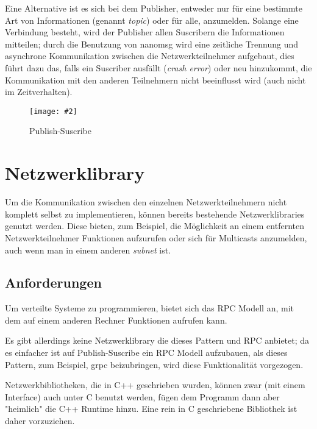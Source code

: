 \documentclass[
    12pt,
    bibliography=totoc,
    ngerman,
    enabledeprecatedfontcommands
]{scrartcl}
\newcommand{\includevisio}[2][]{\texttt{[image: \#2]}}
\begin{document}
Eine Alternative ist es sich bei dem Publisher, entweder nur f{\"{u}}r eine bestimmte Art von Informationen (genannt \textit{topic}) oder f{\"{u}}r alle, anzumelden. Solange eine Verbindung besteht,
wird der Publisher allen Suscribern die Informationen mitteilen; durch die Benutzung von nanomsg wird eine zeitliche Trennung und asynchrone Kommunikation zwischen die Netzwerkteilnehmer aufgebaut,
dies f{\"{u}}hrt dazu das, falls ein Suscriber ausf{\"{a}}llt (\textit{crash error}) oder neu hinzukommt, die Kommunikation mit den anderen Teilnehmern nicht beeinflusst wird (auch nicht im Zeitverhalten).
\begin{figure}
	\centering
	\includevisio{pubsub}
	\caption{Publish-Suscribe}
	\label{fig:pubsub}
\end{figure}


\clearpage
\section{Netzwerklibrary}
Um die Kommunikation zwischen den einzelnen Netzwerkteilnehmern nicht komplett selbst zu implementieren, k{\"{o}}nnen bereits bestehende Netzwerklibraries genutzt werden.
Diese bieten, zum Beispiel, die M{\"{o}}glichkeit an einem entfernten Netzwerkteilnehmer Funktionen aufzurufen oder sich f{\"{u}}r Multicasts anzumelden, auch wenn man in einem anderen
\textit{subnet} ist.

\subsection{Anforderungen}
Um verteilte Systeme zu programmieren, bietet sich das RPC Modell an, mit dem auf einem anderen Rechner Funktionen aufrufen kann.

Es gibt allerdings keine Netzwerklibrary die dieses Pattern und RPC anbietet; da es einfacher ist auf Publish-Suscribe ein RPC Modell aufzubauen, als dieses Pattern, zum Beispiel, grpc beizubringen, wird
diese Funktionalit{\"{a}}t vorgezogen.

Netzwerkbibliotheken, die in C++ geschrieben wurden, k{\"{o}}nnen zwar (mit einem Interface) auch unter C benutzt werden, f{\"{u}}gen dem Programm
dann aber "heimlich" die C++ Runtime hinzu. Eine rein in C geschriebene Bibliothek ist daher vorzuziehen.
\end{document}
